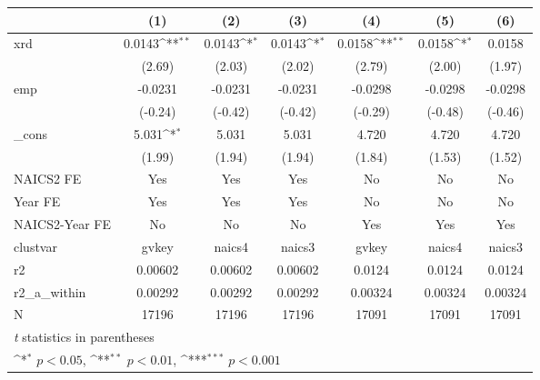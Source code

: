 {
\def\sym#1{\ifmmode^{#1}\else\(^{#1}\)\fi}
\begin{tabular}{l*{6}{c}}
\hline\hline
            &\multicolumn{1}{c}{(1)}         &\multicolumn{1}{c}{(2)}         &\multicolumn{1}{c}{(3)}         &\multicolumn{1}{c}{(4)}         &\multicolumn{1}{c}{(5)}         &\multicolumn{1}{c}{(6)}         \\
\hline
xrd         &      0.0143\sym{**} &      0.0143\sym{*}  &      0.0143\sym{*}  &      0.0158\sym{**} &      0.0158\sym{*}  &      0.0158         \\
            &      (2.69)         &      (2.03)         &      (2.02)         &      (2.79)         &      (2.00)         &      (1.97)         \\
[1em]
emp         &     -0.0231         &     -0.0231         &     -0.0231         &     -0.0298         &     -0.0298         &     -0.0298         \\
            &     (-0.24)         &     (-0.42)         &     (-0.42)         &     (-0.29)         &     (-0.48)         &     (-0.46)         \\
[1em]
\_cons      &       5.031\sym{*}  &       5.031         &       5.031         &       4.720         &       4.720         &       4.720         \\
            &      (1.99)         &      (1.94)         &      (1.94)         &      (1.84)         &      (1.53)         &      (1.52)         \\
[1em]
NAICS2 FE   &         Yes         &         Yes         &         Yes         &          No         &          No         &          No         \\
[1em]
Year FE     &         Yes         &         Yes         &         Yes         &          No         &          No         &          No         \\
[1em]
NAICS2-Year FE&          No         &          No         &          No         &         Yes         &         Yes         &         Yes         \\
\hline
clustvar    &       gvkey         &      naics4         &      naics3         &       gvkey         &      naics4         &      naics3         \\
r2          &     0.00602         &     0.00602         &     0.00602         &      0.0124         &      0.0124         &      0.0124         \\
r2\_a\_within &     0.00292         &     0.00292         &     0.00292         &     0.00324         &     0.00324         &     0.00324         \\
N           &       17196         &       17196         &       17196         &       17091         &       17091         &       17091         \\
\hline\hline
\multicolumn{7}{l}{\footnotesize \textit{t} statistics in parentheses}\\
\multicolumn{7}{l}{\footnotesize \sym{*} \(p<0.05\), \sym{**} \(p<0.01\), \sym{***} \(p<0.001\)}\\
\end{tabular}
}

